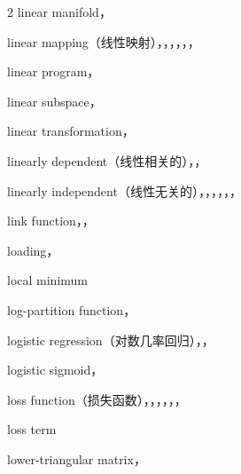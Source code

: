 \begin{multicols}{2}
\noindent linear manifold，\par
\noindent linear mapping（线性映射），，，，，，\par
\noindent linear program，\par
\noindent linear subspace，\par
\noindent linear transformation，\par
\noindent linearly dependent（线性相关的），，\par
\noindent linearly independent（线性无关的），，，，，，\par
\noindent link function，，\par
\noindent loading，\par
\noindent local minimum\par
\noindent log-partition function，\par
\noindent logistic regression（对数几率回归），，\par
\noindent logistic sigmoid，\par
\noindent loss function（损失函数），，，，，，\par
\noindent loss term\par
\noindent lower-triangular matrix，\par


\end{multicols}
